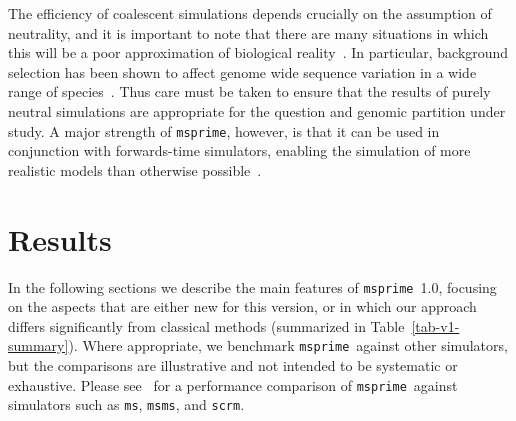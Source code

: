 \documentclass[9pt,twocolumn,twoside,lineno]{gsajnl}
\newcommand{\msprime}[0]{\texttt{msprime}}
\newcommand{\ms}[0]{\texttt{ms}}
\newcommand{\msms}[0]{\texttt{msms}}
\newcommand{\scrm}[0]{\texttt{scrm}}
\begin{document}
The efficiency of coalescent simulations depends
crucially on the assumption of neutrality, and it is important
to note that there are many situations in which this will be a poor approximation
of biological reality~\citep{johri2021statistical}.
In particular, background selection has been shown to affect genome wide
sequence variation in a wide range of
species~\citep{charlesworth1993effect,charlesworth1995pattern,charlesworth2021effects}.
Thus care must be taken to ensure that the results of purely neutral simulations are
appropriate for the question and genomic partition under study.
A major strength of \msprime, however, is that it can be used in conjunction
with forwards-time simulators, enabling the simulation of
more realistic models than otherwise
possible~\citep{kelleher2018efficient,haller2018tree}.

\section*{Results}
In the following sections we describe the main features of \msprime\ 1.0,
focusing on the aspects that are either new for this version, or in which
our approach differs significantly from classical methods
(summarized in Table~\ref{tab-v1-summary}).
Where appropriate,
we benchmark \msprime\ against other simulators, but the comparisons are
illustrative and not intended to be systematic or exhaustive. Please
see~\cite{kelleher2016efficient} for a performance comparison of
\msprime\ against simulators such as \ms, \msms, and \scrm.
\end{document}

